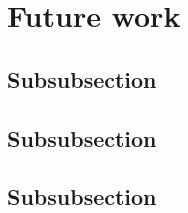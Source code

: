 \section{Future work}
\label{sec71}


\lipsum[1]

\subsection{Subsubsection}
\label{sec711}

\lipsum[1]

\subsection{Subsubsection}
\label{sec712}

\lipsum[1]

\subsection{Subsubsection}
\label{sec713}

\lipsum[1]
